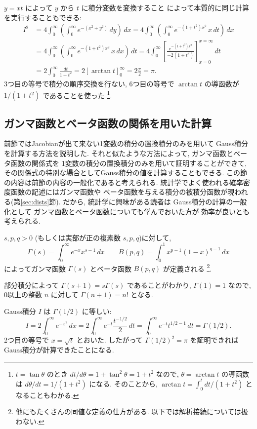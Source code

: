 \documentclass[12pt,twoside]{jarticle}
\theoremstyle{jplain}
\theoremstyle{jplain}
\theoremstyle{jplain}
\numberwithin{theorem}{section}
\numberwithin{equation}{section}
\numberwithin{figure}{section}
\numberwithin{table}{section}
\newcommand\secref[1]{第\ref{#1}節}
\begin{document}
$y=xt$ によって $y$ から $t$ に積分変数を変換すること
によって本質的に同じ計算を実行することもできる:
\begin{align*}
I^2
&=4
\int_0^\infty
\left(
\int_0^\infty e^{-(x^2+y^2)}\,dy
\right)\,dx
=4
\int_0^\infty
\left(
\int_0^\infty e^{-(1+t^2)x^2}\,x \,dt
\right)\,dx
\\ &
=4
\int_0^\infty
\left(
\int_0^\infty e^{-(1+t^2)x^2}\,x \,dx
\right)\,dt
=4
\int_0^\infty\left[\frac{e^{-(1+t^2)x^2}}{-2(1+t^2)}\right]_{x=0}^{x=\infty}\,dt
\\ &
=2
\int_0^\infty\frac{dt}{1+t^2}
=2[\arctan t]_0^\infty
=2\frac{\pi}{2}
=\pi.
\end{align*}
3つ目の等号で積分の順序交換を行ない, 6つ目の等号で $\arctan t$ の導函数が $1/(1+t^2)$
であることを使った%
\footnote{$t=\tan\theta$ のとき $dt/d\theta = 1+\tan^2\theta=1+t^2$ なので, 
$\theta=\arctan t$ の導函数は $d\theta/dt = 1/(1+t^2)$ になる.
そのことから, $\arctan t = \int_0^t dt/(1+t^2)$ となることもわかる.}. 


\subsection{ガンマ函数とベータ函数の関係を用いた計算}
\label{sec:GaussGamma}

前節ではJacobianが出て来ない1変数の積分の置換積分のみを用いて
Gauss積分を計算する方法を説明した.
それと似たような方法によって, 
ガンマ函数とベータ函数の関係式を
1変数の積分の置換積分のみを用いて証明することができて, 
その関係式の特別な場合としてGauss積分の値を計算することもできる.
この節の内容は前節の内容の一般化であると考えられる.
統計学でよく使われる確率密度函数の記述にはガンマ函数や
ベータ函数を与える積分の被積分函数が現われる(\secref{sec:dists}).
だから, 統計学に興味がある読者は
Gauss積分の計算の一般化として
ガンマ函数とベータ函数についても学んでおいた方が
効率が良いとも考えられる.

$s,p,q>0$ (もしくは実部が正の複素数 $s,p,q$)に対して,
\[
\Gamma(s)=\int_0^\infty e^{-x}x^{s-1}\,dx
\qquad
B(p,q)=\int_0^1 x^{p-1}(1-x)^{q-1}\,dx
\]
によってガンマ函数 $\Gamma(s)$ とベータ函数 $B(p,q)$ が定義される%
\footnote{他にもたくさんの同値な定義の仕方がある.
以下では解析接続については扱わない.}.

部分積分によって $\Gamma(s+1)=s\Gamma(s)$ であることがわかり, 
$\Gamma(1)=1$ なので, 0以上の整数 $n$ に対して $\Gamma(n+1)=n!$ となる.

Gauss積分 $I$ は $\Gamma(1/2)$ に等しい:
\[
I
=2\int_0^\infty e^{-x^2}\,dx
=2\int_0^\infty e^{-t} \frac{t^{-1/2}}{2}\,dt
=\int_0^\infty e^{-t}t^{1/2-1}\,dt
=\Gamma(1/2).
\]
2つ目の等号で $x=\sqrt{t}$ とおいた.
したがって $\Gamma(1/2)^2=\pi$ を証明できれば
Gauss積分が計算できたことになる.
\end{document}
